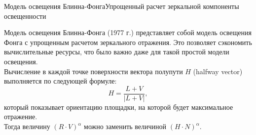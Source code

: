 \documentclass{beamer}
\begin{document}
	\begin{frame}{Модель освещения Блинна-Фонга}{Упрощенный расчет зеркальной компоненты освещенности}
		
		Модель освещения Блинна-Фонга (1977 г.) представляет собой модель освещения Фонга с упрощенным расчетом зеркального отражения. 
		Это позволяет сэкономить вычислительные ресурсы, что было важно даже для такой простой модели освещения.\\
		Вычисление в каждой точке поверхности вектора полупути $H$ (halfway vector) выполняется по следующей формуле:
		\[
			H=\frac{L+V}{|L+V|}
			,
		\]
		который показывает ориентацию площадки, на которой будет максимальное отражение. 
		\\
		Тогда величину $(R\cdot V)^\alpha$ можно заменить величиной $(H \cdot N)^{\alpha}$.



	\end{frame}
\end{document}
